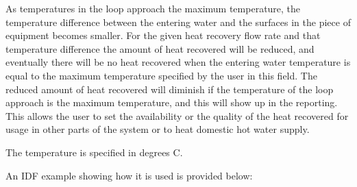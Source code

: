 As temperatures in the loop approach the maximum temperature, the temperature difference between the entering water and the surfaces in the piece of equipment becomes smaller. For the given heat recovery flow rate and that temperature difference the amount of heat recovered will be reduced, and eventually there will be no heat recovered when the entering water temperature is equal to the maximum temperature specified by the user in this field. The reduced amount of heat recovered will diminish if the temperature of the loop approach is the maximum temperature, and this will show up in the reporting. This allows the user to set the availability or the quality of the heat recovered for usage in other parts of the system or to heat domestic hot water supply.

The temperature is specified in degrees C.

An IDF example showing how it is used is provided below:

